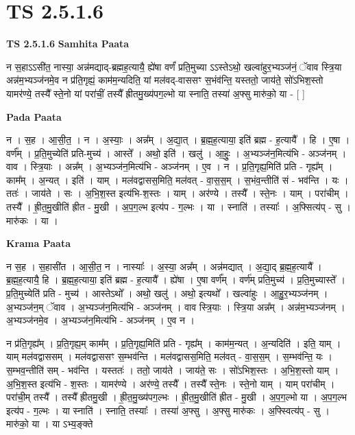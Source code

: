 \documentclass[17pt]{extarticle}
\begin{document}
\section{ TS 2.5.1.6 }

\textbf{TS 2.5.1.6 } \newline
\textbf{Samhita Paata} \newline

न स॒हाऽऽसी॑त॒ नास्या॒ अन्न॑मद्याद्-ब्रह्मह॒त्यायै॒ ह्ये॑षा वर्णं॑ प्रति॒मुच्या ऽऽस्तेऽथो॒ खल्वा॑हुर॒भ्यञ्ज॑नं॒ ॅवाव स्त्रि॒या अन्न॑म॒भ्यञ्ज॑नमे॒व न प्र॑ति॒गृह्यं॒ काम॑म॒न्यदिति॒ यां मल॑वद्-वाससꣳ स॒भंव॑न्ति॒ यस्ततो॒ जाय॑ते॒ सो॑ऽभिश॒स्तो यामर॑ण्ये॒ तस्यै᳚ स्ते॒नो यां परा॑चीं॒ तस्यै᳚ ह्रीतमु॒ख्य॑पग॒ल्भो या स्नाति॒ तस्या॑ अ॒फ्सु मारु॑को॒ या - [  ] \newline

\textbf{Pada Paata} \newline

न । स॒ह । आ॒सी॒त॒ । न । अ॒स्याः॒ । अन्न᳚म् । अ॒द्या॒त् । ब्र॒ह्म॒ह॒त्याया॒ इति॑ ब्रह्म - ह॒त्यायै᳚ । हि । ए॒षा । वर्ण᳚म् । प्र॒ति॒मुच्येति॑ प्रति-मुच्य॑ । आस्ते᳚ । अथो॒ इति॑ । खलु॑ । आ॒हुः॒ । अ॒भ्यञ्ज॑न॒मित्य॑भि - अञ्ज॑नम् । वाव । स्त्रि॒याः । अन्न᳚म् । अ॒भ्यञ्ज॑न॒मित्य॑भि - अञ्ज॑नम् । ए॒व । न । प्र॒ति॒गृह्य॒मिति॑ प्रति - गृह्य᳚म् । काम᳚म् । अ॒न्यत् । इति॑ । याम् । मल॑वद्वासस॒मिति॒ मल॑वत् - वा॒स॒स॒म् । स॒भंव॒न्तीति॑ सं - भव॑न्ति । यः । ततः॑ । जाय॑ते । सः । अ॒भि॒श॒स्त इत्य॑भि-श॒स्तः । याम् । अर॑ण्ये । तस्यै᳚ । स्ते॒नः । याम् । परा॑चीम् । तस्यै᳚ । ह्री॒त॒मु॒खीति॑ ह्रीत - मु॒खी । अ॒प॒ग॒ल्भ इत्य॑प - ग॒ल्भः । या । स्नाति॑ । तस्याः᳚ । अ॒फ्सित्य॑प् - सु । मारु॑कः । या ।  \newline


\textbf{Krama Paata} \newline

न स॒ह । स॒हासी॑त । आ॒सी॒त॒ न । नास्याः᳚ । अ॒स्या॒ अन्न᳚म् । अन्न॑मद्यात् । अ॒द्या॒द् ब्र॒ह्म॒ह॒त्यायै᳚ । ब्र॒ह्म॒ह॒त्यायै॒ हि । ब्र॒ह्म॒ह॒त्याया॒ इति॑ ब्रह्म - ह॒त्यायै᳚ । ह्ये॑षा । ए॒षा वर्ण᳚म् । वर्ण॑म् प्रति॒मुच्य॑ । प्र॒ति॒मुच्यास्ते᳚ । प्र॒ति॒मुच्येति॑ प्रति - मुच्य॑ । आस्तेऽथो᳚ । अथो॒ खलु॑ । अथो॒ इत्यथो᳚ । खल्वा॑हुः । 
आ॒हु॒र॒भ्यञ्ज॑नम् । अ॒भ्यञ्ज॑न॒म् ॅवाव । अ॒भ्यञ्ज॑न॒मित्य॑भि - अञ्ज॑नम् । वाव स्त्रि॒याः । स्त्रि॒या अन्न᳚म् । अन्न॑म॒भ्यञ्ज॑नम् । अ॒भ्यञ्ज॑नमे॒व । अ॒भ्यञ्ज॑न॒मित्य॑भि - अञ्ज॑नम् । ए॒व न । 

न प्र॑ति॒गृह्य᳚म् । प्र॒ति॒गृह्य॒म् काम᳚म् । प्र॒ति॒गृह्य॒मिति॑ प्रति - गृह्य᳚म् । काम॑म॒न्यत् । अ॒न्यदिति॑ । इति॒ याम् । याम् मल॑वद्वाससम् । मल॑वद्वाससꣳ स॒म्भव॑न्ति । मल॑वद्वासस॒मिति॒ मल॑वत् - वा॒स॒स॒म् । स॒म्भव॑न्ति॒ यः । स॒म्भव॒न्तीति॑ सम् - भव॑न्ति । यस्ततः॑ । ततो॒ जाय॑ते । जाय॑ते॒ सः । सो॑ऽभिश॒स्तः । अ॒भि॒श॒स्तो याम् । अ॒भि॒श॒स्त इत्य॑भि - श॒स्तः । यामर॑ण्ये । अर॑ण्ये॒ तस्यै᳚ । तस्यै᳚ स्ते॒नः । स्ते॒नो याम् । याम् परा॑चीम् । परा॑ची॒म् तस्यै᳚ । तस्यै᳚ ह्रीतमु॒खी । ह्री॒त॒मु॒ख्य॑पग॒ल्भः । ह्री॒त॒मु॒खीति॑ ह्रीत - मु॒खी । अ॒प॒ग॒ल्भो या । अ॒प॒ग॒ल्भ इत्य॑प - ग॒ल्भः । या स्नाति॑ । स्नाति॒ तस्याः᳚ । तस्या॑ अ॒फ्सु । अ॒फ्सु मारु॑कः । अ॒फ्स्वित्य॑प् - सु । मारु॑को॒ या । या ऽभ्य॒ङ्क्ते \newline
\end{document}
